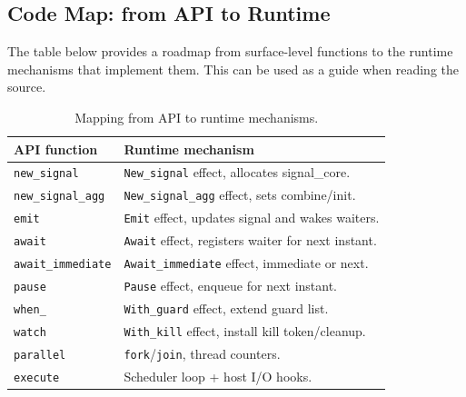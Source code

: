 \subsection{Code Map: from API to Runtime}
The table below provides a roadmap from surface-level functions to the runtime
mechanisms that implement them. This can be used as a guide when reading the
source.
\begin{table}[h]
\centering
\begin{tabularx}{\linewidth}{lY}
\hline
API function & Runtime mechanism \\ \hline
\texttt{new\_signal} & \texttt{New\_signal} effect, allocates signal\_core. \\
\texttt{new\_signal\_agg} & \texttt{New\_signal\_agg} effect, sets combine/init. \\
\texttt{emit} & \texttt{Emit} effect, updates signal and wakes waiters. \\
\texttt{await} & \texttt{Await} effect, registers waiter for next instant. \\
\texttt{await\_immediate} & \texttt{Await\_immediate} effect, immediate or next. \\
\texttt{pause} & \texttt{Pause} effect, enqueue for next instant. \\
\texttt{when\_} & \texttt{With\_guard} effect, extend guard list. \\
\texttt{watch} & \texttt{With\_kill} effect, install kill token/cleanup. \\
\texttt{parallel} & \texttt{fork}/\texttt{join}, thread counters. \\
\texttt{execute} & Scheduler loop + host I/O hooks. \\ \hline
\end{tabularx}
\caption{Mapping from API to runtime mechanisms.}
\end{table}
